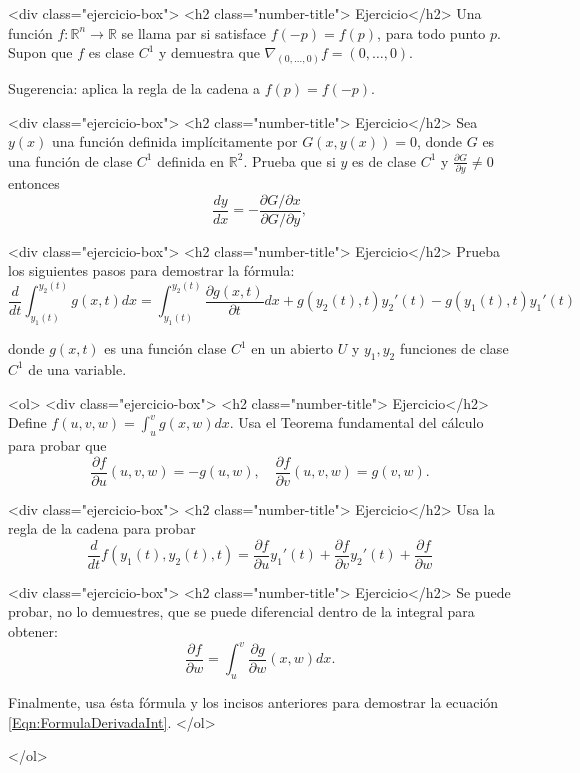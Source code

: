 \documentclass{article}
\theoremstyle{definition}
\begin{document}
  
<div class="ejercicio-box"> <h2 class="number-title"> Ejercicio</h2> Una función $f:\mathbb{R}^n \to \mathbb{R}$ se llama par si
satisface $f(-p)=f(p)$, para todo punto  $p$. Supon que $f$ es clase
$C^1$ y demuestra que  $\nabla_{(0,\dots, 0)}f=(0,\dots, 0)$.

Sugerencia: aplica la regla de la cadena a $f(p)=f(-p)$. 



<div class="ejercicio-box"> <h2 class="number-title"> Ejercicio</h2> Sea $y(x)$ una función definida implícitamente por $G(x,y(x))=0$,
  donde $G$ es una función de clase $C^1$ definida en $\mathbb{R}^2$.
  Prueba que si $y$ es de clase
  $C^1$  y  $\frac{\partial G}{\partial y}\ne 0$ entonces
  $$
  \frac{dy}{dx}=-\frac{ \partial G/ \partial x}{\partial G/\partial y}, 
  $$



<div class="ejercicio-box"> <h2 class="number-title"> Ejercicio</h2> Prueba los siguientes pasos para demostrar la  fórmula:
  \begin{equation}\label{Eqn:FormulaDerivadaInt}
  \frac{d}{dt} \int_{y_1(t)}^{y_2(t)}g(x,t)dx=
  \int_{y_1(t)}^{y_2(t)}\frac{\partial g(x,t)}{\partial t}dx+ g(y_2(t),t)y_2'(t)
  -g(y_1(t),t)y_1'(t)
  \end{equation}

  donde $g(x,t)$ es una función clase $C^1$ en un abierto $U$
  y $y_1,y_2$ funciones de clase $C^1$ de una variable.

  <ol>
  <div class="ejercicio-box"> <h2 class="number-title"> Ejercicio</h2> Define $f(u,v,w)=\int_u^v g(x,w)dx$. Usa el Teorema fundamental
    del cálculo para probar que
    $$
    \frac{\partial f}{\partial u}(u,v,w)=-g(u,w),
    \quad \frac{\partial f}{\partial v}(u,v,w)=g(v,w).
    $$

  <div class="ejercicio-box"> <h2 class="number-title"> Ejercicio</h2> Usa la regla de la cadena para probar
    $$
    \frac{d}{dt} f(y_1(t),y_2(t),t)= \frac{\partial f}{\partial u}
    y_1'(t)+ \frac{\partial f}{\partial v}y_2'(t)
    +\frac{\partial f}{\partial w}
    $$

  <div class="ejercicio-box"> <h2 class="number-title"> Ejercicio</h2> Se puede probar, no lo demuestres, que se puede diferencial
    dentro  de la integral para obtener:
    $$
    \frac{\partial f}{\partial w}=\int_{u}^v
    \frac{\partial g}{\partial w}(x,w)dx.
    $$

    Finalmente, usa ésta fórmula y los incisos anteriores
    para demostrar la ecuación \eqref{Eqn:FormulaDerivadaInt}. 
  </ol>
  
  
</ol>

  
       
\end{document}
